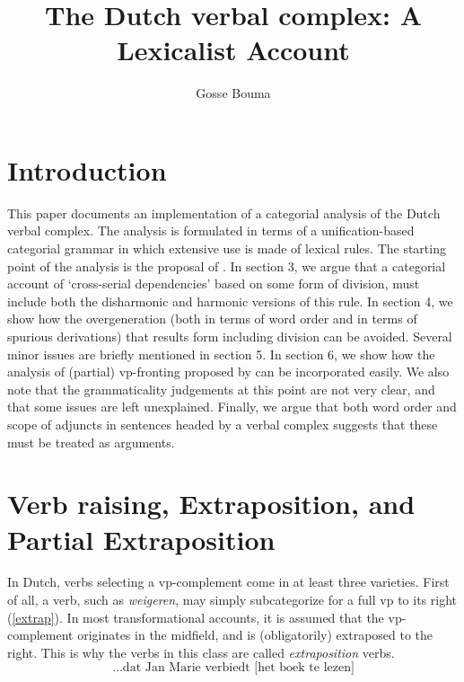 


\title{The Dutch verbal complex: A Lexicalist Account}
\author{Gosse Bouma}

\maketitle

\tableofcontents

\section{Introduction}

This paper documents an implementation of a categorial analysis of the Dutch verbal complex. The analysis is formulated in terms of  a unification-based categorial grammar in which extensive use is made of lexical rules. The starting point of the analysis is the proposal of . In section 3, we argue that a categorial account of `cross-serial dependencies' based on some form of division, must include both the disharmonic and harmonic versions of this rule. In section 4, we show how the overgeneration (both in terms of word order and in terms of spurious derivations) that results form including division  can be avoided. Several minor issues are briefly mentioned in section 5. In section 6, we show how the analysis of (partial) {\sc vp}-fronting proposed by  can be incorporated easily. We also note that the  grammaticality judgements at this point are not very clear, and that some issues are left unexplained. Finally, we argue that both word order and scope of adjuncts in sentences headed by a verbal complex suggests that these must be treated as arguments. 

\section{Verb raising, Extraposition, and Partial Extraposition}

In Dutch, verbs selecting a {\sc vp}-complement come in at least three 
varieties. First of all, a verb, such as {\em weigeren}, may simply 
subcategorize for a full {\sc vp} to its right (\ref{extrap}). In most 
transformational accounts, it is assumed that the {\sc vp}-complement originates 
in the midfield, and is (obligatorily) extraposed to the right. This is why the 
verbs in this class are called {\em extraposition} verbs. 
\begin{equation}
\label{extrap}
\mbox{\ldots dat Jan Marie verbiedt [het boek te lezen]} 
\end{equation}

